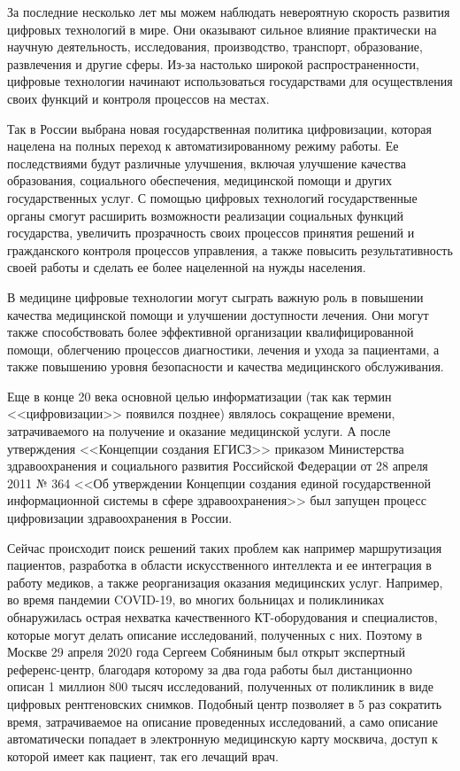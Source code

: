 \introduction %

За последние несколько лет мы можем наблюдать невероятную скорость развития цифровых технологий в мире. Они оказывают сильное влияние практически на научную деятельность, исследования, производство, транспорт, образование, развлечения и другие сферы. Из-за настолько широкой распространенности, цифровые технологии начинают использоваться государствами для осуществления своих функций и контроля процессов на местах.

Так в России выбрана новая государственная политика цифровизации, которая нацелена на полных переход к автоматизированному режиму работы. Ее последствиями будут различные улучшения, включая улучшение качества образования, социального обеспечения, медицинской помощи и других государственных услуг. С помощью цифровых технологий государственные органы смогут расширить возможности реализации социальных функций государства, увеличить прозрачность своих процессов принятия решений и гражданского контроля процессов управления, а также повысить результативность своей работы и сделать ее более нацеленной на нужды населения.

В медицине цифровые технологии могут сыграть важную роль в повышении качества медицинской помощи и улучшении доступности лечения. Они могут также способствовать более эффективной организации квалифицированной помощи, облегчению процессов диагностики, лечения и ухода за пациентами, а также повышению уровня безопасности и качества медицинского обслуживания.

Еще в конце 20 века основной целью информатизации (так как термин <<цифровизации>> появился позднее)  являлось сокращение времени, затрачиваемого на получение и оказание медицинской услуги. А после утверждения <<Концепции создания ЕГИСЗ>> приказом Министерства здравоохранения и социального развития Российской Федерации от 28 апреля 2011 № 364 <<Об утверждении Концепции создания единой государственной информационной системы в сфере здравоохранения>> был запущен процесс цифровизации здравоохранения в России.

Сейчас происходит поиск решений таких проблем как например маршрутизация пациентов, разработка в области искусственного интеллекта и ее интеграция в работу медиков, а также реорганизация оказания медицинских услуг. Например, во время пандемии COVID-19, во многих больницах и поликлиниках обнаружилась острая нехватка качественного КТ-оборудования и специалистов, которые могут делать описание исследований, полученных с них. Поэтому в Москве 29 апреля 2020 года Сергеем Собяниным был открыт экспертный референс-центр, благодаря которому за два года работы был дистанционно описан 1 миллион 800 тысяч исследований, полученных от поликлиник в виде цифровых рентгеновских снимков. Подобный центр позволяет в 5 раз сократить время, затрачиваемое на описание проведенных исследований, а само описание автоматически попадает в электронную медицинскую карту москвича, доступ к которой имеет как пациент, так его лечащий врач.

